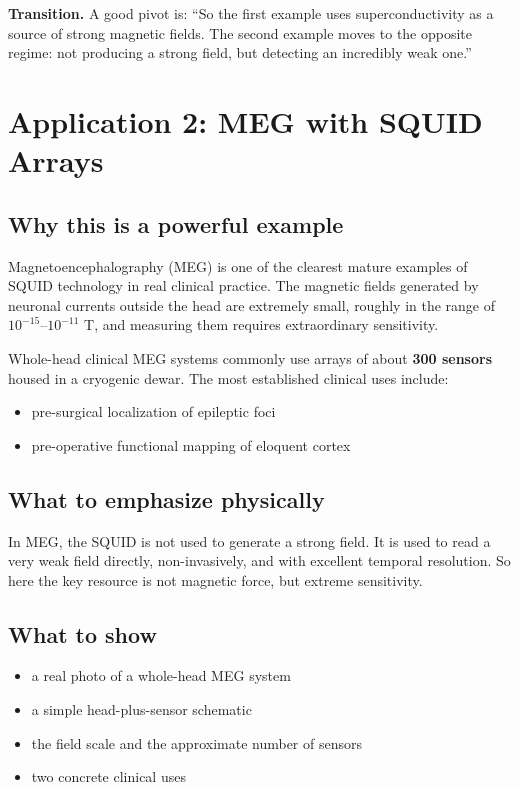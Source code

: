 \documentclass[11pt,a4paper]{article}
\newcommand{\transition}[1]{%
  {\color{accent}\textbf{Transition.}} #1
}
\begin{document}
\transition{A good pivot is: ``So the first example uses superconductivity as a source of strong magnetic fields. The second example moves to the opposite regime: not producing a strong field, but detecting an incredibly weak one.''}

\section{Application 2: MEG with SQUID Arrays}

\subsection{Why this is a powerful example}

Magnetoencephalography (MEG) is one of the clearest mature examples of SQUID technology in real clinical practice. The magnetic fields generated by neuronal currents outside the head are extremely small, roughly in the range of $10^{-15}$--$10^{-11}$ T, and measuring them requires extraordinary sensitivity.

Whole-head clinical MEG systems commonly use arrays of about \textbf{300 sensors} housed in a cryogenic dewar. The most established clinical uses include:

\begin{itemize}
  \item pre-surgical localization of epileptic foci
  \item pre-operative functional mapping of eloquent cortex
\end{itemize}

\subsection{What to emphasize physically}

In MEG, the SQUID is not used to generate a strong field. It is used to read a very weak field directly, non-invasively, and with excellent temporal resolution. So here the key resource is not magnetic force, but extreme sensitivity.

\subsection{What to show}

\begin{itemize}
  \item a real photo of a whole-head MEG system
  \item a simple head-plus-sensor schematic
  \item the field scale and the approximate number of sensors
  \item two concrete clinical uses
\end{itemize}
\end{document}
